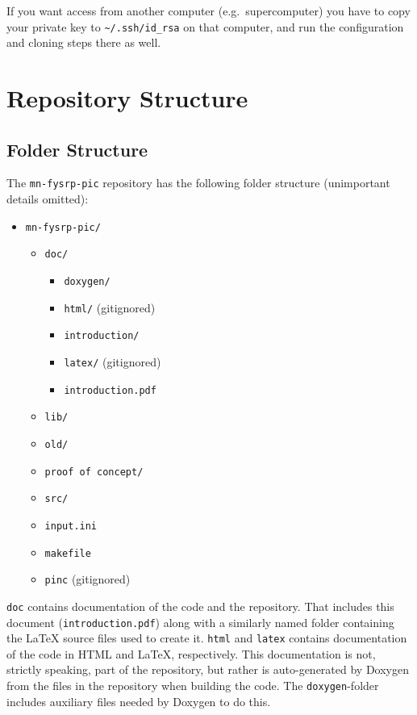 \documentclass[10pt,a4paper]{article}
\newcommand{\mnfysrppic}{\texttt{mn-fysrp-pic}}
\begin{document}
If you want access from another computer (e.g.\ supercomputer) you have to copy your private key to \verb$~/.ssh/id_rsa$ on that computer, and run the configuration and cloning steps there as well. 

\section{Repository Structure}

\subsection{Folder Structure}
The \mnfysrppic{} repository has the following folder structure (unimportant details omitted):

\begin{itemize}[label={}]
	\item \verb$mn-fysrp-pic/$
	\begin{itemize}[label={}]
		\item \verb$doc/$
		\begin{itemize}[label={}]
			\item \verb$doxygen/$
			\item \verb$html/$ (gitignored)
			\item \verb$introduction/$
			\item \verb$latex/$ (gitignored)
			\item \verb$introduction.pdf$
		\end{itemize}
		\item \verb$lib/$
		\item \verb$old/$
		\item \verb$proof of concept/$
		\item \verb$src/$
		\item \verb$input.ini$
		\item \verb$makefile$
		\item \verb$pinc$ (gitignored)
	\end{itemize}
\end{itemize}

\verb$doc$ contains documentation of the code and the repository. That includes this document (\verb$introduction.pdf$) along with a similarly named folder containing the \LaTeX{} source files used to create it. \verb$html$ and \verb$latex$ contains documentation of the code in HTML and LaTeX, respectively. This documentation is not, strictly speaking, part of the repository, but rather is auto-generated by Doxygen from the files in the repository when building the code. The \verb$doxygen$-folder includes auxiliary files needed by Doxygen to do this.
\end{document}
